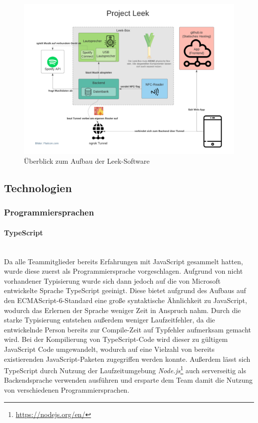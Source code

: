 \documentclass[10pt, a4paper]{article}
\begin{document}
\begin{onehalfspace}
  \begin{figure}[h]
    \includegraphics[width=\linewidth]{LeekSoftware_Overview.png}
    \caption{Überblick zum Aufbau der Leek-Software}
    \label{fig:LeekSoftwareOverview}
  \end{figure}

  \subsection{Technologien}

  \label{technologien}

  \subsubsection{Programmiersprachen}

  \paragraph*{TypeScript} $~$ \\
  Da alle Teammitglieder bereits Erfahrungen mit JavaScript gesammelt hatten, wurde diese zuerst als Programmiersprache vorgeschlagen.
  Aufgrund von nicht vorhandener Typisierung wurde sich dann jedoch auf die von Microsoft entwickelte Sprache TypeScript geeinigt. Diese bietet aufgrund des
  Aufbaus auf den ECMAScript-6-Standard eine große syntaktische Ähnlichkeit zu JavaScript, wodurch das Erlernen der Sprache weniger Zeit in Anspruch nahm.
  Durch die starke Typisierung entstehen außerdem weniger Laufzeitfehler, da die entwickelnde Person bereits zur Compile-Zeit auf Typfehler aufmerksam gemacht wird.\cite{Typescript_Typisierung}
  Bei der Kompilierung von TypeScript-Code wird dieser zu gültigem JavaScript Code umgewandelt, wodurch auf eine Vielzahl von bereits existierenden JavaScript-Paketen zugegriffen werden konnte.
  Außerdem lässt sich TypeScript durch Nutzung der Laufzeitumgebung \textit{Node.js}\footnote{\url{https://nodejs.org/en/}} auch serverseitig als Backendsprache verwenden ausführen und ersparte dem Team damit die Nutzung von verschiedenen Programmiersprachen.


\end{onehalfspace}
\end{document}
